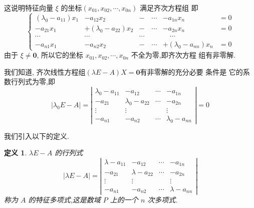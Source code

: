 \documentclass[13pt]{beamer}
\newtheorem*{defi}{定义}
\begin{document}
\begin{frame}
这说明特征向量 $\xi$ 的坐标$\left(x_{01}, x_{02}, \cdots, x_{0 n}\right)$ 满足齐次方程组
即
\[
\left\{\begin{array}{rrrrr}
\left(\lambda_{0}-a_{11}\right) x_{1}&-a_{12} x_{2}&-\quad \cdots& -a_{1 n} x_{n}&=0 \\
-a_{21} x_{1}& +\left(\lambda_{0}-a_{22}\right) x_{2}& - \quad \cdots& -a_{2 n} x_{n}&=0 \\
\cdots& \cdots &\cdots &\quad \cdots  & \\
-a_{n 1} x_{1} & -a_{n 2} x_{2} & - \quad \cdots & +\left(\lambda_{0}-a_{n n}\right) x_{n}& =0
\end{array}\right.
\]
由于 $\xi\neq \mathbf{0}$, 所以它的坐标  $x_{01}, x_{02}, \cdots, x_{0 n}$ 不全为零,即齐次方程 组有非零解.

我们知道, 齐次线性方程组$(\lambda E-A)X=\mathbf{0}$有非零解的充分必要 条件是 它的系数行列式为零,即
\[
\left|\lambda_{0} {E}-{A}\right|=\left|\begin{array}{cccc}
\lambda_{0}-a_{11} & -a_{12} &  \cdots & -a_{1 n} \\
-a_{21} & \lambda_{0}-a_{22} &  \cdots & -a_{2 n} \\
\vdots & \vdots & & \vdots \\
-a_{n 1} & -a_{n 2} & \cdots & \lambda_{0}-a_{n n}
\end{array}\right|=0
\]
\end{frame}


\begin{frame}
我们引入以下的定义. 
\begin{defi}
$\lambda {E}-{A}$ 的行列式
\[
|\lambda {E}-{A}|=\left|\begin{array}{cccc}
\lambda-a_{11} & -a_{12} &  \cdots &-a_{1 n} \\
-a_{21} & \lambda-a_{22} & \cdots & -a_{2 n} \\
\vdots & \vdots & & \vdots \\
-a_{n 1} & -a_{n 2} & \cdots & \lambda-a_{n n}
\end{array}\right|
\]
称为 $A$ 的特征多项式,这是数域 $P$ 上的一个 $n$ 次多项式.
\end{defi}


\end{frame}
\end{document}
